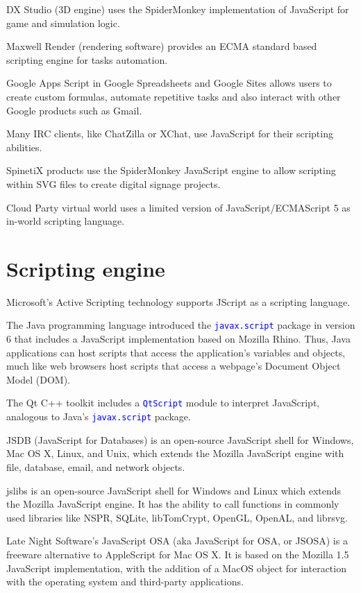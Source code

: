 \begin{compactitem}
\item DX Studio (3D engine) uses the SpiderMonkey implementation of JavaScript for game and simulation logic.
\item Maxwell Render (rendering software) provides an ECMA standard based scripting engine for tasks automation.
\item Google Apps Script in Google Spreadsheets and Google Sites allows users to create custom formulas, automate repetitive tasks and also interact with other Google products such as Gmail.
\item Many IRC clients, like ChatZilla or XChat, use JavaScript for their scripting abilities.
\item SpinetiX products use the SpiderMonkey JavaScript engine to allow scripting within SVG files to create digital signage projects.
\item Cloud Party virtual world uses a limited version of JavaScript/ECMAScript 5 as in-world scripting language.
\end{compactitem}


\section{Scripting engine}


\begin{compactitem}
\item Microsoft's Active Scripting technology supports JScript as a scripting language.
\item The Java programming language introduced the \textcolor{Blue}{\texttt{javax.script}} package in version 6 that includes a JavaScript implementation based on Mozilla Rhino. Thus, Java applications can host scripts that access the application's variables and objects, much like web browsers host scripts that access a webpage's Document Object Model (DOM).
\item The Qt C++ toolkit includes a \textcolor{Blue}{\texttt{QtScript}} module to interpret JavaScript, analogous to Java's \textcolor{Blue}{\texttt{javax.script}} package.
\item JSDB (JavaScript for Databases) is an open-source JavaScript shell for Windows, Mac OS X, Linux, and Unix, which extends the Mozilla JavaScript engine with file, database, email, and network objects.
\item jslibs is an open-source JavaScript shell for Windows and Linux which extends the Mozilla JavaScript engine. It has the ability to call functions in commonly used libraries like NSPR, SQLite, libTomCrypt, OpenGL, OpenAL, and librsvg.
\item Late Night Software's JavaScript OSA (aka JavaScript for OSA, or JSOSA) is a freeware alternative to AppleScript for Mac OS X. It is based on the Mozilla 1.5 JavaScript implementation, with the addition of a MacOS object for interaction with the operating system and third-party applications.
\end{compactitem}


